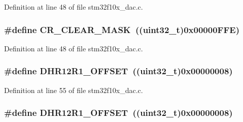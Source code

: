 Definition at line 48 of file stm32f10x\+\_\+dac.\+c.

\subsubsection[{\texorpdfstring{C\+R\+\_\+\+C\+L\+E\+A\+R\+\_\+\+M\+A\+SK}{CR_CLEAR_MASK}}]{\setlength{\rightskip}{0pt plus 5cm}\#define C\+R\+\_\+\+C\+L\+E\+A\+R\+\_\+\+M\+A\+SK~(({\bf uint32\+\_\+t})0x00000\+F\+F\+E)}\hypertarget{group___d_a_c___private___defines_ga8a5812a1d5ced986bb997a4bb7ae697d}{}\label{group___d_a_c___private___defines_ga8a5812a1d5ced986bb997a4bb7ae697d}


Definition at line 48 of file stm32f10x\+\_\+dac.\+c.

\subsubsection[{\texorpdfstring{D\+H\+R12\+R1\+\_\+\+O\+F\+F\+S\+ET}{DHR12R1_OFFSET}}]{\setlength{\rightskip}{0pt plus 5cm}\#define D\+H\+R12\+R1\+\_\+\+O\+F\+F\+S\+ET~(({\bf uint32\+\_\+t})0x00000008)}\hypertarget{group___d_a_c___private___defines_gaf1305e3b7cfb0f898678baeab6e91cbf}{}\label{group___d_a_c___private___defines_gaf1305e3b7cfb0f898678baeab6e91cbf}


Definition at line 55 of file stm32f10x\+\_\+dac.\+c.

\subsubsection[{\texorpdfstring{D\+H\+R12\+R1\+\_\+\+O\+F\+F\+S\+ET}{DHR12R1_OFFSET}}]{\setlength{\rightskip}{0pt plus 5cm}\#define D\+H\+R12\+R1\+\_\+\+O\+F\+F\+S\+ET~(({\bf uint32\+\_\+t})0x00000008)}\hypertarget{group___d_a_c___private___defines_gaf1305e3b7cfb0f898678baeab6e91cbf}{}\label{group___d_a_c___private___defines_gaf1305e3b7cfb0f898678baeab6e91cbf}


